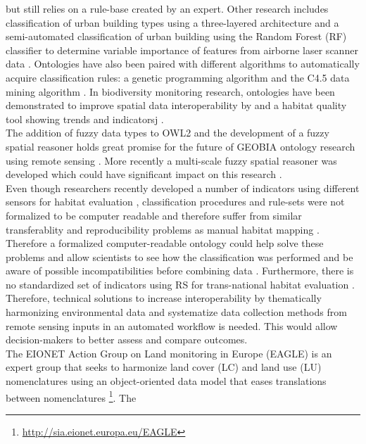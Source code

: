 \documentclass[authoryear, review,12pt,number]{elsarticle}
\begin{document}
but still relies on a rule-base created by an expert\citep{Lucas2015}. Other 
research includes classification of urban building types using a three-layered 
architecture \citep{diSciascio2013} and a semi-automated classification of 
urban building using the Random Forest (RF) classifier to determine variable 
importance of features from airborne laser scanner data \citep{Belgiu2014}. 
Ontologies have also been paired with different algorithms to automatically 
acquire classification rules: a genetic programming algorithm 
\citep{Forestier2012470} and the C4.5 data mining algorithm 
\citep{Sheeren2006ML}. In biodiversity monitoring research,
ontologies have been demonstrated to improve spatial data interoperability 
by \citep{Nieland2015} and a habitat quality tool showing trends and 
indicatorsj \citep{Perez-Luque2015}. 
\\
The addition of fuzzy data types to OWL2 
and the development of a fuzzy spatial reasoner holds great promise for the 
future of GEOBIA ontology research using remote sensing \citep{Bobillo2011, 
Bobillo2015}. More recently a multi-scale fuzzy spatial reasoner was developed 
which could have significant impact on this research \citep{Argyridis2015}.
\\
Even though researchers recently developed a number of indicators using
different sensors for habitat evaluation \citep{Nagendra2013}, classification
procedures and rule-sets were not formalized to be computer readable and
therefore suffer from similar transferablity and reproducibility problems as
manual habitat mapping \citep{Arvor2013, Nieland2015}.
Therefore a formalized computer-readable ontology could help solve these
problems and allow scientists to see how the classification was performed and 
be aware of possible incompatibilities before combining 
data \citep{Janowicz2012}. 
Furthermore, there is no standardized set of indicators
using RS for trans-national habitat evaluation \citep{Lucas2015}. Therefore,
technical solutions to increase interoperability by thematically harmonizing
environmental data and systematize data collection methods from remote sensing
inputs in an automated workflow is needed. This would allow decision-makers 
to better assess and compare outcomes.
\\
The EIONET Action Group on Land monitoring in Europe (EAGLE) is an expert group 
that seeks to harmonize land cover (LC) and land use (LU) 
nomenclatures using an object-oriented data model that eases translations 
between nomenclatures \footnote{\url{http://sia.eionet.europa.eu/EAGLE}}. The 
\end{document}
